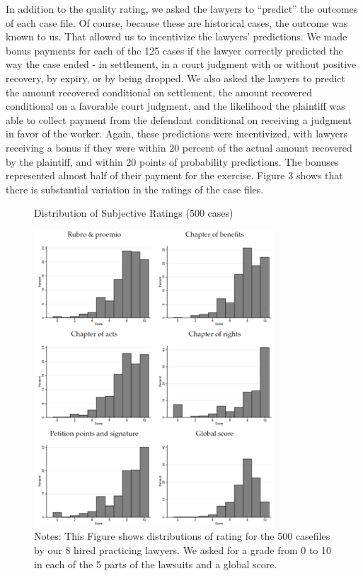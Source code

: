 \documentclass[oneside,12pt]{article}
\begin{document}
In addition to the quality rating, we asked the lawyers to “predict” the outcomes of each case file. Of course, because these are historical cases, the outcome was known to us. That allowed us to incentivize the lawyers’ predictions. We made bonus payments for each of the 125 cases if the lawyer correctly predicted the way the case ended - in settlement, in a court judgment with or without positive recovery, by expiry, or by being dropped. We also asked the lawyers to predict the amount recovered conditional on settlement, the amount recovered conditional on a favorable court judgment, and the likelihood the plaintiff was able to collect payment from the defendant conditional on receiving a judgment in favor of the worker. Again, these predictions were incentivized, with lawyers receiving a bonus if they were within 20 percent of the actual amount recovered by the plaintiff, and within 20 points of probability predictions. The bonuses represented almost half of their payment for the exercise. Figure 3 shows that there is substantial variation in the ratings of the case files. 

\begin{figure}[hp]%
 \centering
 \caption{Distribution of Subjective Ratings (500 cases)}
 \includegraphics[width=0.8\textwidth]{Figures/Figure3.png}
 \caption*{Notes: This Figure shows distributions of rating for the 500 casefiles by our 8 hired practicing lawyers. We asked for a grade from 0 to 10 in each of the 5 parts of the lawsuits and a global score.}
 \label{fig:3}
\end{figure}%
\end{document}

